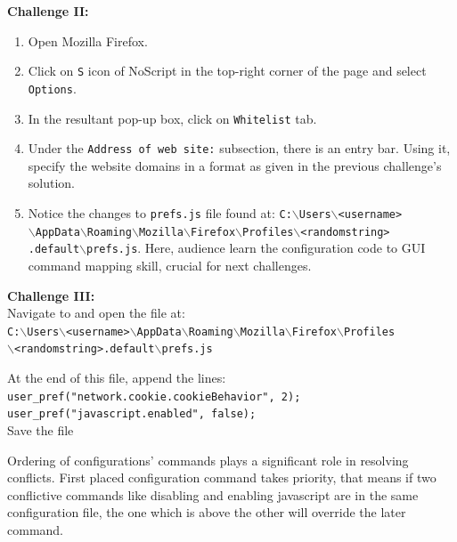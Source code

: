 \documentclass[12pt]{extarticle}
\begin{document}
	\vspace{4mm}
	\item \textbf{Challenge II:}
	\begin{enumerate}
		\item Open Mozilla Firefox.
		\item { Click on \texttt{S} icon of NoScript in the top-right corner of the page and select \texttt{Options}}.
		\item In the resultant pop-up box, click on \texttt{Whitelist} tab.
		\item Under the \texttt{Address of web site:} subsection, there is  an entry bar. Using it, specify the website domains in a format as given in the previous challenge's solution.
		\item Notice the changes to \texttt{prefs.js} file found at: \texttt{C:$\backslash$Users$\backslash$<username>\\$\backslash$AppData$\backslash$Roaming$\backslash$Mozilla$\backslash$Firefox$\backslash$Profiles$\backslash$<randomstring>\\.default$\backslash$prefs.js}. Here, audience learn the configuration code to GUI command mapping skill, crucial for next challenges. 
	\end{enumerate} 

	\vspace{4mm}
	\item \textbf{Challenge III:}\\
	Navigate to and open the file at:\\ \texttt{C:$\backslash$Users$\backslash$<username>$\backslash$AppData$\backslash$Roaming$\backslash$Mozilla$\backslash$Firefox$\backslash$Profiles\\$\backslash$<randomstring>.default$\backslash$prefs.js}
	
	\vspace{2mm}
	\noindent
	At the end of this file, append the lines:\\
	\texttt{user\_pref("network.cookie.cookieBehavior", 2);\\
	user\_pref("javascript.enabled", false);}\\
	Save the file
	
	\vspace{2mm}
	\noindent
	Ordering of configurations' commands plays a significant role in resolving conflicts. First placed configuration command takes priority, that means if two conflictive commands like disabling and enabling javascript are in the same configuration file, the one which is above the other will override the later command. 
	
\end{document}
